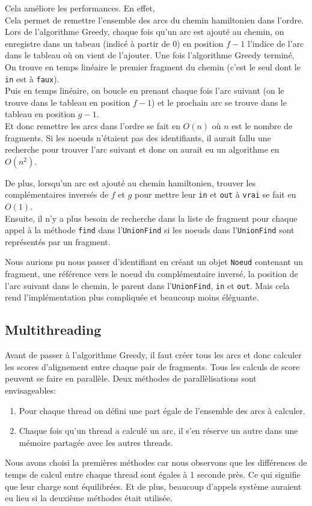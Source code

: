 Cela améliore les performances. En effet,\\
Cela permet de remettre l'ensemble des arcs du chemin hamiltonien dans l'ordre.
Lors de l'algorithme Greedy, chaque fois qu'un arc  est ajouté au chemin, on enregistre dans un tabeau (indicé à partir de 0) en position $f-1$ l'indice de l'arc dans le tableau où on vient de l'ajouter.
Une fois l'algorithme Greedy terminé,\\
On trouve en temps linéaire le premier fragment du chemin (c'est le seul dont le \texttt{in} est à \texttt{faux}).\\
Puis en temps linéaire, on boucle en prenant chaque fois l'arc  suivant (on le trouve dans le tableau en position $f-1$) et le prochain arc se trouve dans le tableau en position $g-1$.\\
Et donc remettre les arcs dans l'ordre se fait en $O(n)$ où $n$ est le nombre de fragments.
Si les noeuds n'étaient pas des identifiants, il aurait fallu une recherche pour trouver l'arc suivant et donc on aurait eu un algorithme en $O\left(n^2\right)$.

De plus, lorsqu'un arc  est ajouté au chemin hamiltonien, trouver les complémentaires inversés de $f$ et $g$ pour mettre leur \texttt{in} et \texttt{out} à \texttt{vrai} se fait en $O(1)$.\\
Ensuite, il n'y a plus besoin de recherche dans la liste de fragment pour chaque appel à la méthode \texttt{find} dans l'\texttt{UnionFind} si les noeuds dans l'\texttt{UnionFind} sont représentés par un fragment.

Nous aurions pu nous passer d'identifiant en créant un objet \texttt{Noeud} contenant un fragment, une référence vers le noeud du complémentaire inversé, la position de l'arc suivant dans le chemin, le parent dans l'\texttt{UnionFind}, \texttt{in} et \texttt{out}.
Mais cela rend l'implémentation plus compliquée et beaucoup moins éléguante.

\subsection{Multithreading}
Avant de passer à l'algorithme Greedy, il faut créer tous les arcs et donc calculer les scores d'alignement entre chaque pair de fragments.
Tous les calculs de score peuvent se faire en parallèle. Deux méthodes de parallèlisations sont envisageables:
\begin{enumerate}
 \item Pour chaque thread on défini une part égale de l'ensemble des arcs à calculer.
 \item Chaque fois qu'un thread a calculé un arc, il s'en réserve un autre dans une mémoire partagée avec les autres threads.
\end{enumerate}
Nous avons choisi la premières méthodes car nous observons que les différences de temps de calcul entre chaque thread sont égales à 1 seconde près. %
Ce qui signifie que leur charge sont équilibrées.
Et de plus, beaucoup d'appels système auraient eu lieu si la deuxième méthodes était utilisée.

